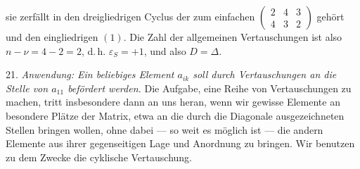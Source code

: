 \documentclass[11pt]{article}
\providecommand{\weberpage}[1]{}
\begin{document}
\weberpage{28}
sie zerf\"allt in den dreigliedrigen Cyclus der zum einfachen $\begin{pmatrix} 2 & 4 & 3 \\ 4 & 3 & 2 \end{pmatrix}$ geh\"ort und den eingliedrigen $(1)$. Die Zahl der allgemeinen Vertauschungen ist also $n - \nu = 4 - 2 = 2$, d.\,h. $\varepsilon_S = + 1$, und also $D = \varDelta$.

21. \textit{Anwendung: Ein beliebiges Element $a_{ik}$ soll durch Vertauschungen an die Stelle von $a_{11}$ bef\"ordert werden.} Die Aufgabe, eine Reihe von Vertauschungen zu machen, tritt insbesondere dann an uns heran, wenn wir gewisse Elemente an besondere Pl\"atze der Matrix, etwa an die durch die Diagonale ausgezeichneten Stellen bringen wollen, ohne dabei --- so weit es m\"oglich ist --- die andern Elemente aus ihrer gegenseitigen Lage und Anordnung zu bringen. Wir benutzen zu dem Zwecke die cyklische Vertauschung.
\end{document}
